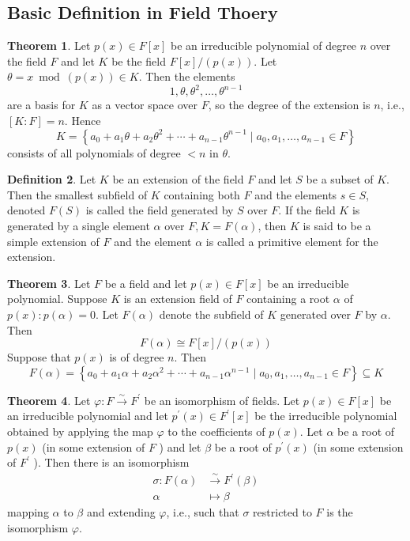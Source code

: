 \documentclass[a4paper,12pt]{article}
\theoremstyle{definition}
\newtheorem{defn}{Definition}[subsection]
\newtheorem{theo}[defn]{Theorem}
\begin{document}
\subsection{Basic Definition in Field Thoery}
\begin{theo}
    Let $p(x) \in F[x]$ be an irreducible polynomial of degree $n$ over the field $F$ and let $K$ be the field $F[x] /(p(x))$. Let $\theta=x \bmod (p(x)) \in K$. Then the elements
    $$
        1, \theta, \theta^2, \ldots, \theta^{n-1}
    $$
    are a basis for $K$ as a vector space over $F$, so the degree of the extension is $n$, i.e., $[K: F]=n$. Hence
    $$
        K=\left\{a_0+a_1 \theta+a_2 \theta^2+\cdots+a_{n-1} \theta^{n-1} \mid a_0, a_1, \ldots, a_{n-1} \in F\right\}
    $$
    consists of all polynomials of degree $<n$ in $\theta$.
\end{theo}
\begin{defn}
    Let $K$ be an extension of the field $F$ and let $S$ be a subset of $K$. Then the smallest subfield of $K$ containing both $F$ and the elements $s\in S$, denoted $F(S)$ is called the field generated by $S$ over $F$.
    If the field $K$ is generated by a single element $\alpha$ over $F, K=F(\alpha)$, then $K$ is said to be a simple extension of $F$ and the element $\alpha$ is called a primitive element for the extension.
\end{defn}
\begin{theo}
    Let $F$ be a field and let $p(x) \in F[x]$ be an irreducible polynomial. Suppose $K$ is an extension field of $F$ containing a root $\alpha$ of $p(x): p(\alpha)=0$. Let $F(\alpha)$ denote the subfield of $K$ generated over $F$ by $\alpha$. Then
    $$
        F(\alpha) \cong F[x] /(p(x))
    $$
    Suppose that $p(x)$ is of degree $n$. Then
    $$
        F(\alpha)=\left\{a_0+a_1 \alpha+a_2 \alpha^2+\cdots+a_{n-1} \alpha^{n-1} \mid a_0, a_1, \ldots, a_{n-1} \in F\right\} \subseteq K
    $$
    \label{theorem:extension by irr polynomial}
\end{theo}
\begin{theo}
    Let $\varphi: F \xrightarrow{\sim} F^{\prime}$ be an isomorphism of fields. Let $p(x) \in F[x]$ be an irreducible polynomial and let $p^{\prime}(x) \in F^{\prime}[x]$ be the irreducible polynomial obtained by applying the map $\varphi$ to the coefficients of $p(x)$. Let $\alpha$ be a root of $p(x)$ (in some extension of $F$ ) and let $\beta$ be a root of $p^{\prime}(x)$ (in some extension of $F^{\prime}$ ). Then there is an isomorphism
    $$
        \begin{aligned}
            \sigma: F(\alpha) & \xrightarrow{\sim} F^{\prime}(\beta) \\
            \alpha            & \longmapsto \beta
        \end{aligned}
    $$
    mapping $\alpha$ to $\beta$ and extending $\varphi$, i.e., such that $\sigma$ restricted to $F$ is the isomorphism $\varphi$.
    \label{theorem:extend simple extenison}
\end{theo}
\end{document}
